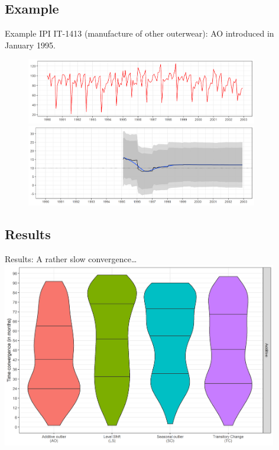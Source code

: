 \documentclass[10pt]{beamer}
\begin{document}
\subsection{Example}
\begin{frame}{Example}
\footnotesize
IPI IT-1413 (manufacture of other outerwear): AO introduced in January 1995. 
\normalsize
\begin{figure}
\centering
\includegraphics[width=0.9\textwidth]{img/AO_ipi_it1413_y.png}

\includegraphics[width=0.9\textwidth]{img/AO_ipi_it1413_est.png}
\end{figure}
\end{frame}


\subsection{Results}
\begin{frame}{Results: A rather slow convergence\ldots{}}
\centering
\includegraphics[width=0.9\textwidth]{img/outliers_convergence_additif_5.png}\\
\end{frame}
\end{document}
